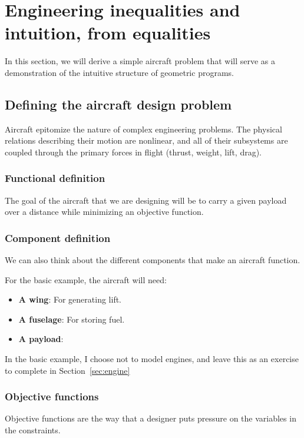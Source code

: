 \chapter{Engineering inequalities and intuition, from equalities}

In this section, we will derive a simple aircraft problem that will serve as a demonstration of the intuitive structure of geometric programs. 

\section{Defining the aircraft design problem}

Aircraft epitomize the nature of complex engineering problems. The physical 
relations describing their motion are nonlinear, and all of their subsystems are 
coupled through the primary forces in flight (thrust, weight, lift, drag). 

\subsection{Functional definition}

The goal of the aircraft that we are designing will be to carry a given payload
over a distance while minimizing an objective function. 

\subsection{Component definition}

We can also think about the different components that make an aircraft function. 

For the basic example, the aircraft will need:
\begin{itemize}
	\item \textbf{A wing}: For generating lift. 
	\item \textbf{A fuselage}: For storing fuel. 
	\item \textbf{A payload}:
\end{itemize}

In the basic example, I choose not to model engines, and leave this as an exercise
to complete in Section~\ref{sec:engine}

\subsection{Objective functions}

Objective functions are the way that a designer puts pressure on the variables 
in the constraints. 

